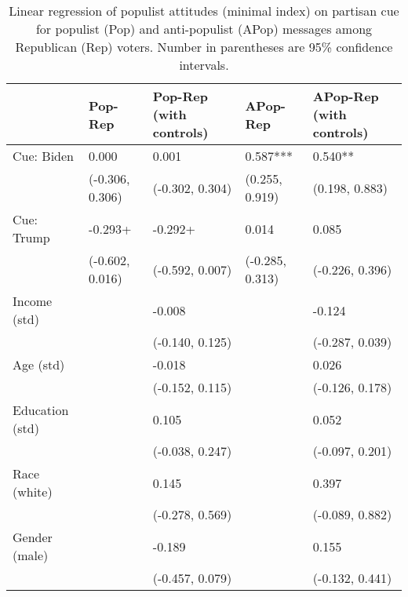 \begin{table}[th!]
\centering
\caption{Linear regression of populist attitudes (minimal index) on partisan cue for populist (Pop) and anti-populist (APop) messages among Republican (Rep) voters. Number in parentheses are 95\% confidence intervals.}
\label{tab-reg-rep-popmin.tex}
\begin{threeparttable}
\begin{tabular}{lC{3cm}C{3cm}C{3cm}C{3cm}}
\toprule
                &         Pop-Rep & Pop-Rep (with controls) &        APop-Rep & APop-Rep (with controls) \\
\midrule
     Cue: Biden &           0.000 &                   0.001 &        0.587*** &                  0.540** \\
                & (-0.306, 0.306) &         (-0.302, 0.304) &  (0.255, 0.919) &           (0.198, 0.883) \\
     Cue: Trump &         -0.293+ &                 -0.292+ &           0.014 &                    0.085 \\
                & (-0.602, 0.016) &         (-0.592, 0.007) & (-0.285, 0.313) &          (-0.226, 0.396) \\
   Income (std) &                 &                  -0.008 &                 &                   -0.124 \\
                &                 &         (-0.140, 0.125) &                 &          (-0.287, 0.039) \\
      Age (std) &                 &                  -0.018 &                 &                    0.026 \\
                &                 &         (-0.152, 0.115) &                 &          (-0.126, 0.178) \\
Education (std) &                 &                   0.105 &                 &                    0.052 \\
                &                 &         (-0.038, 0.247) &                 &          (-0.097, 0.201) \\
   Race (white) &                 &                   0.145 &                 &                    0.397 \\
                &                 &         (-0.278, 0.569) &                 &          (-0.089, 0.882) \\
  Gender (male) &                 &                  -0.189 &                 &                    0.155 \\
                &                 &         (-0.457, 0.079) &                 &          (-0.132, 0.441) \\

\end{tabular}
\end{threeparttable}
\end{table}
